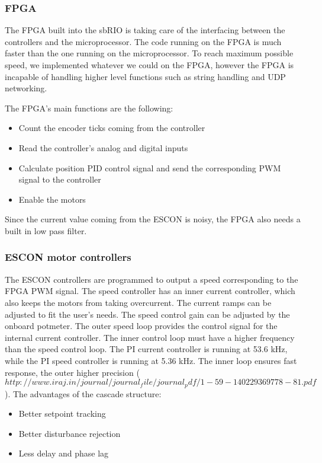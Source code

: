 \subsubsection{FPGA}

The FPGA built into the sbRIO is taking care of the interfacing between the controllers and the microprocessor. The code running on the FPGA is much faster than the one running on the microprocessor. To reach maximum possible speed, we implemented whatever we could on the FPGA, however the FPGA is incapable of handling higher level functions such as string handling and UDP networking.

The FPGA's main functions are the following:

\begin{itemize}	
	\setlength\itemsep{0em}
	\item Count the encoder ticks coming from the controller
	\item Read the controller's analog and digital inputs 
	\item Calculate position PID control signal and send the corresponding PWM signal to the controller
	\item Enable the motors
	
\end{itemize}

Since the current value coming from the ESCON is noisy, the FPGA also needs a built in low pass filter.

\subsubsection{ESCON motor controllers}

The ESCON controllers are programmed to output a speed corresponding to the FPGA PWM signal. The speed controller has an inner current controller, which also keeps the motors from taking overcurrent. The current ramps can be adjusted to fit the user's needs. The speed control gain can be adjusted by the onboard potmeter. 
The outer speed loop provides the control signal for the internal current controller. The inner control loop must have a higher frequency than the speed control loop. The PI current controller is running at 53.6 kHz, while the PI speed controller is running at 5.36 kHz. The inner loop ensures fast response, the outer higher precision ($http://www.iraj.in/journal/journal_file/journal_pdf/1-59-140229369778-81.pdf$). The advantages of the cascade structure:

\begin{itemize}
	\item Better setpoint tracking
	\item Better disturbance rejection
	\item Less delay and phase lag
\end{itemize}

